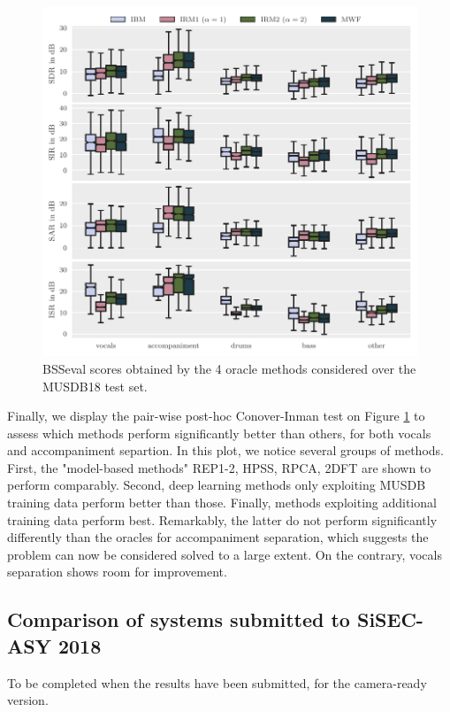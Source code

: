 \documentclass{llncs}
\begin{document}
\begin{figure}[ht]
  \begin{center}
     \includegraphics[width=\linewidth]{fig/oracle-evaluation.pdf}
     \vspace{-1cm}
  \end{center}
  \caption{BSSeval scores obtained by the 4 oracle methods considered over the MUSDB18 test set.}
  \label{fig:pairwise_matrix}
\end{figure}

Finally, we display the pair-wise post-hoc Conover-Inman test on Figure \ref{fig:pairwise_matrix} to assess which methods perform significantly better than others, for both vocals and accompaniment separtion. In this plot, we notice several groups of methods. First, the "model-based methods" REP1-2, HPSS, RPCA, 2DFT are shown to perform comparably. Second, deep learning methods only exploiting MUSDB training data perform better than those. Finally, methods exploiting additional training data perform best. Remarkably, the latter do not perform significantly differently than the oracles for accompaniment separation, which suggests the problem can now be considered solved to a large extent. On the contrary, vocals separation shows room for improvement.

\subsection{Comparison of systems submitted to SiSEC-ASY 2018}
To be completed when the results have been submitted, for the camera-ready version.
\end{document}
